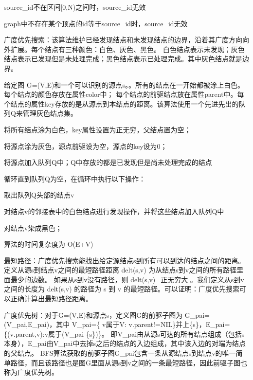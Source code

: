 \begin{DoxyItemize}
\item {\ttfamily source\+\_\+id}不在区间{\ttfamily \mbox{[}0,N)}之间时，{\ttfamily source\+\_\+id}无效
\item {\ttfamily graph}中不存在某个顶点的{\ttfamily id}等于{\ttfamily source\+\_\+id}时，{\ttfamily source\+\_\+id}无效
\end{DoxyItemize}

广度优先搜索：该算法维护已经发现结点和未发现结点的边界，沿着其广度方向向外扩展。每个结点有三种颜色：白色、灰色、黑色。 白色结点表示未发现；灰色结点表示已发现但是未处理完成；黑色结点表示已处理完成。其中灰色结点就是边界。

给定图 G=(V,E)和一个可以识别的源点{\ttfamily s}。。所有的结点在一开始都被涂上白色。每个结点的颜色存放在属性{\ttfamily color}中； 每个结点的前驱结点放在属性{\ttfamily parent}中。每个结点的属性{\ttfamily key}存放的是从源点到本结点的距离。该算法使用一个先进先出的队列\+Q来管理灰色结点集。


\begin{DoxyItemize}
\item 将所有结点涂为白色，{\ttfamily key}属性设置为正无穷，父结点置为空；
\item 将源点涂为灰色，源点前驱设为空，源点的{\ttfamily key}设为0；
\item 将源点加入队列\+Q中；\+Q中存放的都是已发现但是尚未处理完成的结点
\item 循环直到队列\+Q为空，在循环中执行以下操作：
\begin{DoxyItemize}
\item 取出队列\+Q头部的结点{\ttfamily v}
\item 对结点{\ttfamily v}的邻接表中的白色结点进行发现操作，并将这些结点加入队列\+Q中
\item 对结点{\ttfamily v}染成黑色；
\end{DoxyItemize}
\end{DoxyItemize}

算法的时间复杂度为 O(E+\+V)

最短路径：广度优先搜索能找出给定源结点s到所有可以到达的结点之间的距离。定义从源s到结点v之间的最短路径距离 delt(s,v) 为从结点s到v之间的所有路径里面最少的边数。 如果从s到v没有路径，则 delt(s,v)=正无穷大 。我们定义从s到v之间的长度为 delt(s,v) 的路径为 s 到 v 的最短路径。可以证明：广度优先搜索可以正确计算出最短路径距离。

广度优先树：对于\+G=(V,E)和源点s，定义图\+G的前驱子图为 G\+\_\+pai=(V\+\_\+pai,E\+\_\+pai)，其中 V\+\_\+pai=\{ v属于\+V\+: v.\+parent!=N\+I\+L\}并上\{s\}，\+E\+\_\+pai=\{(v.\+parent,v)\+:v属于(V\+\_\+pai-\/\{s\})\}。 即\+V\+\_\+pai由从源s可达的所有结点组成（包括s本身），\+E\+\_\+pai由\+V\+\_\+pai中去掉s之后的结点的入边组成，其中该入边的对端为结点的父结点。 B\+F\+S算法获取的前驱子图\+G\+\_\+pai包含一条从源结点s到结点v的唯一简单路径，而且该路径也是图\+G里面从源s到v之间的一条最短路径，因此前驱子图也称为广度优先树。 

